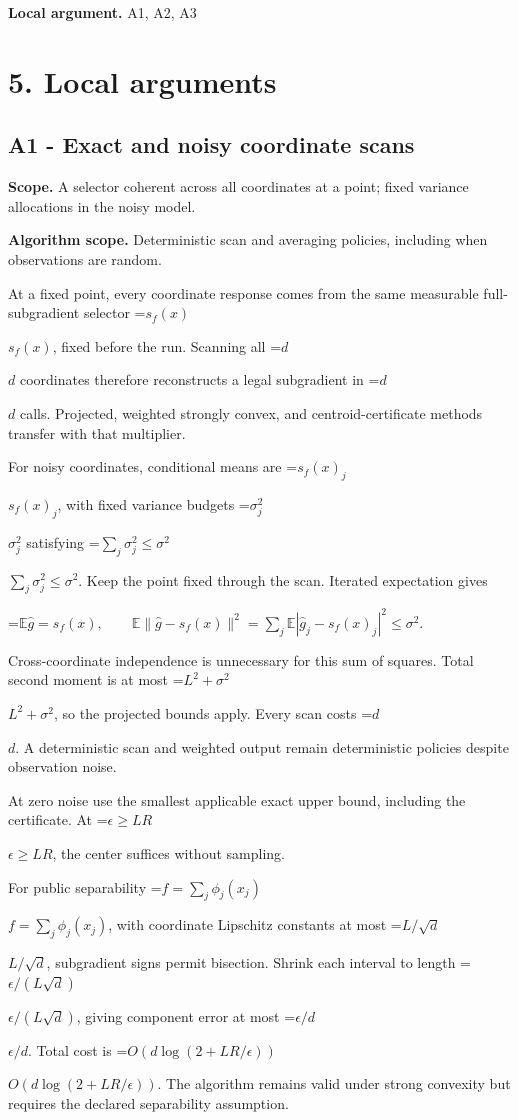 \documentclass[10pt,a4paper]{article}
\newcommand{\AtlasMath}[1]{\par\begingroup\centering\setbox0=\hbox{$\displaystyle #1$}\ifdim\wd0>1.4\linewidth\typeout{ATLAS WIDE FORMULA: \the\wd0}\fi\ifdim\wd0>\linewidth\resizebox{\linewidth}{!}{\box0}\else\box0\fi\par\endgroup}
\newcommand{\AtlasInlineMath}[1]{\begingroup\setbox0=\hbox{$#1$}\ifdim\wd0>.4\linewidth\endgroup\AtlasMath{#1}\else\endgroup$#1$\fi}
\begin{document}
\textbf{Local argument.} A1, A2, A3

\section{5. Local arguments}
\subsection{A1 - Exact and noisy coordinate scans}
\textbf{Scope.} A selector coherent across all coordinates at a point; fixed variance allocations in the noisy model.

\textbf{Algorithm scope.} Deterministic scan and averaging policies, including when observations are random.

At a fixed point, every coordinate response comes from the same measurable full-subgradient selector \AtlasInlineMath{s_f(x)}, fixed before the run. Scanning all \AtlasInlineMath{d} coordinates therefore reconstructs a legal subgradient in \AtlasInlineMath{d} calls. Projected, weighted strongly convex, and centroid-certificate methods transfer with that multiplier.

For noisy coordinates, conditional means are \AtlasInlineMath{s_f(x)_j}, with fixed variance budgets \AtlasInlineMath{\sigma_j^2} satisfying \AtlasInlineMath{\sum_j\sigma_j^2\le\sigma^2}. Keep the point fixed through the scan. Iterated expectation gives

\AtlasMath{\mathbb E\widehat g=s_f(x),\qquad
\mathbb E\|\widehat g-s_f(x)\|^2
=\sum_j\mathbb E|\widehat g_j-s_f(x)_j|^2\le\sigma^2.}

Cross-coordinate independence is unnecessary for this sum of squares. Total second moment is at most \AtlasInlineMath{L^2+\sigma^2}, so the projected bounds apply. Every scan costs \AtlasInlineMath{d}. A deterministic scan and weighted output remain deterministic policies despite observation noise.

At zero noise use the smallest applicable exact upper bound, including the certificate. At \AtlasInlineMath{\epsilon\ge LR}, the center suffices without sampling.

For public separability \AtlasInlineMath{f=\sum_j\phi_j(x_j)}, with coordinate Lipschitz constants at most \AtlasInlineMath{L/\sqrt d}, subgradient signs permit bisection. Shrink each interval to length \AtlasInlineMath{\epsilon/(L\sqrt d)}, giving component error at most \AtlasInlineMath{\epsilon/d}. Total cost is \AtlasInlineMath{O(d\log(2+LR/\epsilon))}. The algorithm remains valid under strong convexity but requires the declared separability assumption.
\end{document}
